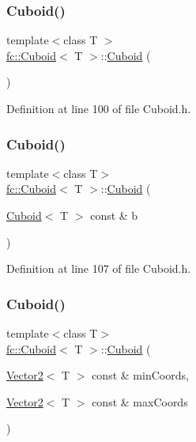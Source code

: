 \subsubsection{\texorpdfstring{Cuboid()}{Cuboid()}\hspace{0.1cm}{\footnotesize\ttfamily [1/3]}}
{\footnotesize\ttfamily template$<$class T $>$ \\
\hyperlink{classfc_1_1Cuboid}{fc\+::\+Cuboid}$<$ T $>$\+::\hyperlink{classfc_1_1Cuboid}{Cuboid} (\begin{DoxyParamCaption}{ }\end{DoxyParamCaption})}



Definition at line 100 of file Cuboid.\+h.

\mbox{\label{classfc_1_1Cuboid_a12532df2783452c02a6e35124a2a8951}} 
\subsubsection{\texorpdfstring{Cuboid()}{Cuboid()}\hspace{0.1cm}{\footnotesize\ttfamily [2/3]}}
{\footnotesize\ttfamily template$<$class T$>$ \\
\hyperlink{classfc_1_1Cuboid}{fc\+::\+Cuboid}$<$ T $>$\+::\hyperlink{classfc_1_1Cuboid}{Cuboid} (\begin{DoxyParamCaption}\item[{\hyperlink{classfc_1_1Cuboid}{Cuboid}$<$ T $>$ const \&}]{b }\end{DoxyParamCaption})}



Definition at line 107 of file Cuboid.\+h.

\mbox{\label{classfc_1_1Cuboid_af5e9fd91f928fa65b2f83eab3028556b}} 
\subsubsection{\texorpdfstring{Cuboid()}{Cuboid()}\hspace{0.1cm}{\footnotesize\ttfamily [3/3]}}
{\footnotesize\ttfamily template$<$class T$>$ \\
\hyperlink{classfc_1_1Cuboid}{fc\+::\+Cuboid}$<$ T $>$\+::\hyperlink{classfc_1_1Cuboid}{Cuboid} (\begin{DoxyParamCaption}\item[{\hyperlink{classfc_1_1Vector2}{Vector2}$<$ T $>$ const \&}]{min\+Coords,  }\item[{\hyperlink{classfc_1_1Vector2}{Vector2}$<$ T $>$ const \&}]{max\+Coords }\end{DoxyParamCaption})}



